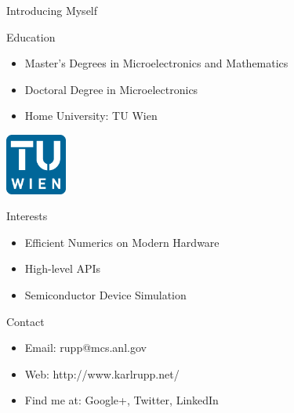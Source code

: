 

\begin{frame}{Introducing Myself}
   \begin{block}{Education}
    \begin{itemize}
     \item Master's Degrees in Microelectronics and Mathematics
     \item Doctoral Degree in Microelectronics
     \item Home University: TU Wien
    \end{itemize}

   \vspace*{-2cm}
   \begin{flushright}
     \includegraphics[width=0.15\textwidth]{figures/TU-Signet}
   \end{flushright}

   \end{block}



   \begin{block}{Interests}
    \begin{itemize}
     \item Efficient Numerics on Modern Hardware
     \item High-level APIs
     \item Semiconductor Device Simulation
    \end{itemize}

   \end{block}

   \begin{block}{Contact}
    \begin{itemize}
     \item Email: rupp@mcs.anl.gov
     \item Web: http://www.karlrupp.net/
     \item Find me at: Google+, Twitter, LinkedIn
    \end{itemize}
   \end{block}

\end{frame}


